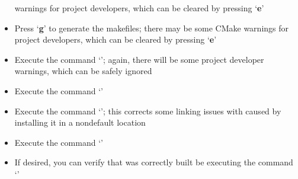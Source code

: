 \begin{itemize}
warnings for project developers, which can be cleared by pressing `\textbf{e}'
\item\exSp{} Press `\textbf{g}' to generate the makefiles; there may be some CMake
warnings for project developers, which can be cleared by pressing `\textbf{e}'
\item\exSp{} Execute the command `'; again, there will be some project
developer warnings, which can be safely ignored
\item\exSp{} Execute the command `'
\item\exSp{} Execute the command `'; this corrects some
linking issues with \yarp{} caused by installing it in a non\longDash{}default location
\item\exSp{} Execute the command `'
\item\exSp{} If desired, you can verify that \yarp{} was correctly built be executing the
command `'
\end{itemize}
\tertiaryEnd
{}
